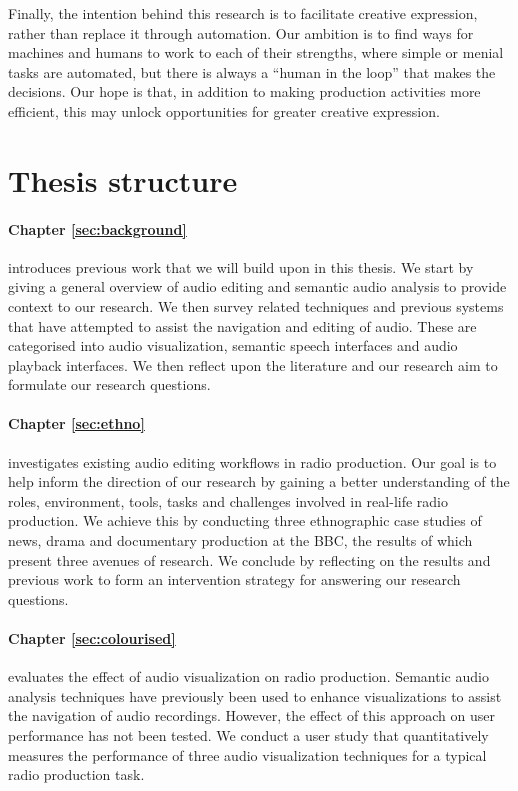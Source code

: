Finally, the intention behind this research is to facilitate creative expression, rather than replace it through
automation.  Our ambition is to find ways for machines and humans to work to each of their strengths, where simple or
menial tasks are automated, but there is always a ``human in the loop'' that makes the decisions.  Our hope is that, in
addition to making production activities more efficient, this may unlock opportunities for greater creative expression.

\section{Thesis structure}\label{sec:intro-structure}

\paragraph{Chapter \ref{sec:background}} introduces previous work that we will build upon in this thesis. We start by
giving a general overview of audio editing and semantic audio analysis to provide context to our research. We then
survey related techniques and previous systems that have attempted to assist the navigation and editing of audio. These
are categorised into audio visualization, semantic speech interfaces and audio playback interfaces. We then reflect
upon the literature and our research aim to formulate our research questions.

\paragraph{Chapter \ref{sec:ethno}} investigates existing audio editing workflows in radio production. Our goal is to
help inform the direction of our research by gaining a better understanding of the roles, environment, tools, tasks and
challenges involved in real-life radio production.  We achieve this by conducting three ethnographic case studies of
news, drama and documentary production at the BBC, the results of which present three avenues of research.  We conclude
by reflecting on the results and previous work to form an intervention strategy for answering our research questions.

\paragraph{Chapter \ref{sec:colourised}} evaluates the effect of audio visualization on radio production.  Semantic
audio analysis techniques have previously been used to enhance visualizations to assist the navigation of audio
recordings. However, the effect of this approach on user performance has not been tested.  We conduct a user study that
quantitatively measures the performance of three audio visualization techniques for a typical radio production task.

